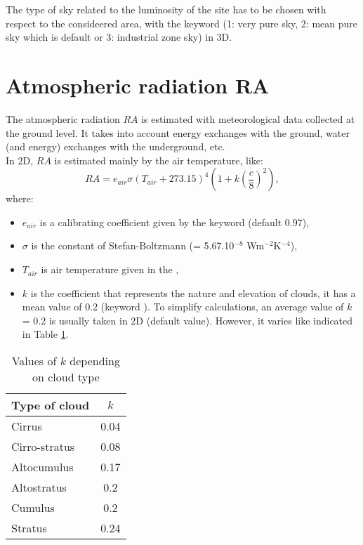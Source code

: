 The type of sky related to the luminosity of the site has to be chosen
with respect to the consideered area, with the \waqtel keyword
 (1: very pure sky, 2: mean pure sky which is default
or 3: industrial zone sky) in 3D.


\section{Atmospheric radiation RA}

The atmospheric radiation $RA$ is estimated with meteorological
data collected at the ground level.
It takes into account energy exchanges with the ground, water
(and energy) exchanges with the underground, etc.\\

In 2D, $RA$ is estimated mainly by the air temperature, like:
\begin{equation*}
RA=e_{air}\sigma\left(T_{air}+273.15 \right)^4\left(1+k\left(\frac{c}{8}\right)^2 \right),
\end{equation*}
where:
\begin{itemize}
\item $e_{air}$ is a calibrating coefficient given by the keyword
   (default 0.97),
\item $\sigma$ is the constant of Stefan-Boltzmann (= 5.67.10${}^{-8}$ Wm${}^{-2}$K${}^{-4}$),
\item $T_{air}$ is air temperature given in the ,
\item $k$ is the coefficient that represents the nature and elevation of clouds,
it has a mean value of 0.2 (keyword ).
To simplify calculations, an average value of $k$ = 0.2 is usually taken in 2D
(default value).
However, it varies like indicated in Table \ref{tab:kcloud}.
\end{itemize}

\begin{table}
  \centering
  \begin{tabular}{|l|c|}
     \hline
     Type of cloud & $k$ \\
     \hline \hline
     Cirrus & 0.04 \\
     Cirro-stratus & 0.08 \\
     Altocumulus & 0.17 \\
     Altostratus & 0.2 \\
     Cumulus & 0.2 \\
     Stratus & 0.24\\
     \hline
   \end{tabular}
  \caption{Values of $k$ depending on cloud type}\label{tab:kcloud}
\end{table}

